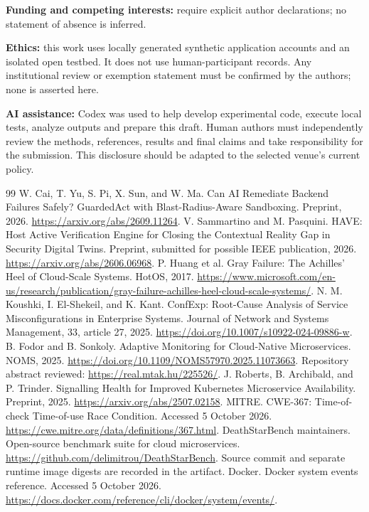 \documentclass[11pt]{article}
\begin{document}
\textbf{Funding and competing interests:} require explicit author declarations; no statement of absence is inferred.

\textbf{Ethics:} this work uses locally generated synthetic application accounts and an isolated open testbed. It does not use human-participant records. Any institutional review or exemption statement must be confirmed by the authors; none is asserted here.

\textbf{AI assistance:} Codex was used to help develop experimental code, execute local tests, analyze outputs and prepare this draft. Human authors must independently review the methods, references, results and final claims and take responsibility for the submission. This disclosure should be adapted to the selected venue's current policy.

\begin{thebibliography}{99}
 W. Cai, T. Yu, S. Pi, X. Sun, and W. Ma. Can AI Remediate Backend Failures Safely? GuardedAct with Blast-Radius-Aware Sandboxing. Preprint, 2026. \url{https://arxiv.org/abs/2609.11264}.
 V. Sammartino and M. Pasquini. HAVE: Host Active Verification Engine for Closing the Contextual Reality Gap in Security Digital Twins. Preprint, submitted for possible IEEE publication, 2026. \url{https://arxiv.org/abs/2606.06968}.
 P. Huang et al. Gray Failure: The Achilles' Heel of Cloud-Scale Systems. HotOS, 2017. \url{https://www.microsoft.com/en-us/research/publication/gray-failure-achilles-heel-cloud-scale-systems/}.
 N. M. Koushki, I. El-Shekeil, and K. Kant. ConfExp: Root-Cause Analysis of Service Misconfigurations in Enterprise Systems. Journal of Network and Systems Management, 33, article 27, 2025. \url{https://doi.org/10.1007/s10922-024-09886-w}.
 B. Fodor and B. Sonkoly. Adaptive Monitoring for Cloud-Native Microservices. NOMS, 2025. \url{https://doi.org/10.1109/NOMS57970.2025.11073663}. Repository abstract reviewed: \url{https://real.mtak.hu/225526/}.
 J. Roberts, B. Archibald, and P. Trinder. Signalling Health for Improved Kubernetes Microservice Availability. Preprint, 2025. \url{https://arxiv.org/abs/2507.02158}.
 MITRE. CWE-367: Time-of-check Time-of-use Race Condition. Accessed 5 October 2026. \url{https://cwe.mitre.org/data/definitions/367.html}.
 DeathStarBench maintainers. Open-source benchmark suite for cloud microservices. \url{https://github.com/delimitrou/DeathStarBench}. Source commit and separate runtime image digests are recorded in the artifact.
 Docker. Docker system events reference. Accessed 5 October 2026. \url{https://docs.docker.com/reference/cli/docker/system/events/}.
\end{thebibliography}
\end{document}
